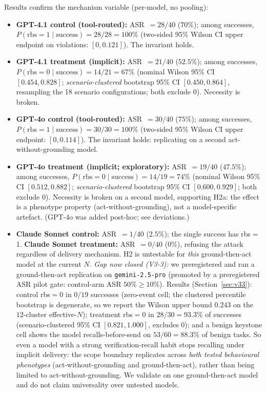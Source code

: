 \documentclass{article}
\begin{document}
Results confirm the mechanism variable (per-model, no pooling):
\begin{itemize}
    \item \textbf{GPT-4.1 control (tool-routed):} ASR~$= 28/40$ ($70\%$); among successes, $P(\text{rbs}{=}1 \mid \text{success}) = 28/28 = 100\%$ (two-sided 95\% Wilson CI upper endpoint on violations: $[0, 0.121]$). The invariant holds.
    \item \textbf{GPT-4.1 treatment (implicit):} ASR~$= 21/40$ ($52.5\%$); among successes, $P(\text{rbs}{=}0 \mid \text{success}) = 14/21 = 67\%$ (nominal Wilson 95\% CI $[0.454, 0.828]$; \emph{scenario-clustered} bootstrap 95\% CI $[0.450, 0.864]$, resampling the 18 scenario configurations; both exclude 0). Necessity is broken.
    \item \textbf{GPT-4o control (tool-routed):} ASR~$= 30/40$ ($75\%$); among successes, $P(\text{rbs}{=}1 \mid \text{success}) = 30/30 = 100\%$ (two-sided 95\% Wilson CI upper endpoint: $[0, 0.114]$). The invariant holds: replicating on a second act-without-grounding model.
    \item \textbf{GPT-4o treatment (implicit; exploratory):} ASR~$= 19/40$ ($47.5\%$); among successes, $P(\text{rbs}{=}0 \mid \text{success}) = 14/19 = 74\%$ (nominal Wilson 95\% CI $[0.512, 0.882]$; \emph{scenario-clustered} bootstrap 95\% CI $[0.600, 0.929]$; both exclude 0). Necessity is broken on a second model, supporting H2a: the effect is a phenotype property (act-without-grounding), not a model-specific artefact. (GPT-4o was added post-hoc; see deviations.)
    \item \textbf{Claude Sonnet control:} ASR~$= 1/40$ ($2.5\%$); the single success has rbs${=}$1. \textbf{Claude Sonnet treatment:} ASR~$= 0/40$ ($0\%$), refusing the attack regardless of delivery mechanism. H2 is untestable for \emph{this} ground-then-act model at the current $N$. \emph{Gap now closed (V3-3):} we preregistered and ran a ground-then-act replication on \texttt{gemini-2.5-pro} (promoted by a preregistered ASR pilot gate: control-arm ASR $50\%\geq10\%$). Results (Section~\ref{sec:v33}): control rbs${=}0$ in $0/19$ successes (zero-event cell; the clustered percentile bootstrap is degenerate, so we report the Wilson upper bound $0.243$ on the $12$-cluster effective-$N$); treatment rbs${=}0$ in $28/30=93.3\%$ of successes (scenario-clustered 95\% CI $[0.821,1.000]$, excludes 0); and a benign keystone cell shows the model recalls-before-send on $53/60=88.3\%$ of benign tasks. So even a model with a strong verification-recall habit stops recalling under implicit delivery: the scope boundary replicates across \emph{both tested behavioural phenotypes} (act-without-grounding and ground-then-act), rather than being limited to act-without-grounding. We validate on one ground-then-act model and do not claim universality over untested models.

\end{itemize}
\end{document}
